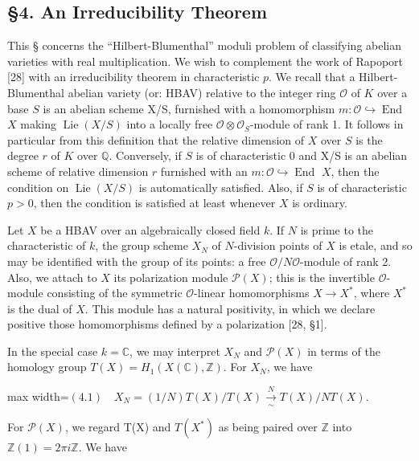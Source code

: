 \documentclass[11pt]{article}
\newcommand{\DFormula}[1]{\par\smallskip\noindent\begin{adjustbox}{max width=\linewidth}$\displaystyle #1$\end{adjustbox}\par\smallskip}
\begin{document}
\subsection*{§4. An Irreducibility Theorem}
\par
This § concerns the “Hilbert-Blumenthal” moduli problem of classifying abelian varieties with real multiplication. We wish to complement the work of Rapoport [28] with an irreducibility theorem in characteristic \(p\). We recall that a Hilbert-Blumenthal abelian variety (or: HBAV) relative to the integer ring \(\mathcal{O}\) of \(K\) over a base \(S\) is an abelian scheme X/S, furnished with a homomorphism \(m:\mathcal{O}\hookrightarrow \operatorname{End}\) \(X\) making \(\operatorname{Lie}(X/S)\) into a locally free \(\mathcal{O}\otimes \mathcal{O}_{S}\)-module of rank 1. It follows in particular from this definition that the relative dimension of \(X\) over \(S\) is the degree \(r\) of \(K\) over \(\mathbb{Q}\). Conversely, if \(S\) is of characteristic 0 and X/S is an abelian scheme of relative dimension \(r\) furnished with an \(m:\mathcal{O}\hookrightarrow \operatorname{End}\) \(X\), then the condition on \(\operatorname{Lie}(X/S)\) is automatically satisfied. Also, if \(S\) is of characteristic \(p>0\), then the condition is satisfied at least whenever \(X\) is ordinary.\par
\par
Let \(X\) be a HBAV over an algebraically closed field \(k\). If \(N\) is prime to the characteristic of \(k\), the group scheme \(X_{N}\) of \(N\)-division points of \(X\) is etale, and so may be identified with the group of its points: a free \(\mathcal{O}/N\mathcal{O}\)-module of rank 2. Also, we attach to \(X\) its polarization module \(\mathcal{P}(X)\); this is the invertible \(\mathcal{O}\)-module consisting of the symmetric \(\mathcal{O}\)-linear homomorphisms \(X\to X^{\ast}\), where \(X^{\ast}\) is the dual of \(X\). This module has a natural positivity, in which we declare positive those homomorphisms defined by a polarization [28, §1].\par
\par
In the special case \(k=\mathbb{C}\), we may interpret \(X_{N}\) and \(\mathcal{P}(X)\) in terms of the homology group \(T(X)=H_{1}(X(\mathbb{C}),\mathbb{Z})\). For \(X_{N}\), we have\par
\par
\DFormula{(4.1)\quad X_N=(1/N)T(X)/T(X)\xrightarrow[\sim]{N}T(X)/NT(X).}
\par
For \(\mathcal{P}(X)\), we regard T(X) and \(T(X^{\ast})\) as being paired over \(\mathbb{Z}\) into \(\mathbb{Z}(1)=2\pi i\mathbb{Z}\). We have\par
\end{document}
